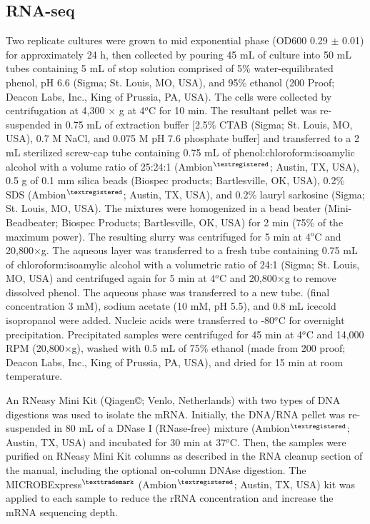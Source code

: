 \subsection{RNA-seq}
Two replicate cultures were grown to mid exponential phase (OD600 0.29 $\pm$ 0.01) for approximately 24 h, then collected by pouring 45 mL of culture into 50 mL tubes containing 5 mL of stop solution comprised of 5\% water-equilibrated phenol, pH 6.6 (Sigma; St. Louis, MO, USA), and 95\% ethanol (200 Proof; Deacon Labs, Inc., King of Prussia, PA, USA).
The cells were collected by centrifugation at 4,300 $\times$ g at 4$^o$C for 10 min.
The resultant pellet was re-suspended in 0.75 mL of extraction buffer [2.5\% CTAB (Sigma; St. Louis, MO, USA), 0.7 M NaCl, and 0.075 M pH 7.6 phosphate buffer] and transferred to a 2 mL sterilized screw-cap tube containing 0.75 mL of phenol:chloroform:isoamylic alcohol with a volume ratio of 25:24:1 (Ambion$^{\textregistered}$; Austin, TX, USA), 0.5 g of 0.1 mm silica beads (Biospec products; Bartlesville, OK, USA), 0.2\% SDS (Ambion$^{\textregistered}$; Austin, TX, USA), and 0.2\% lauryl sarkosine (Sigma; St. Louis, MO, USA).
The mixtures were homogenized in a bead beater (Mini-Beadbeater; Biospec Products; Bartlesville, OK, USA) for 2 min (75\% of the maximum power).
The resulting slurry was centrifuged for 5 min at 4$^o$C and 20,800$\times$g.
The aqueous layer was transferred to a fresh tube containing 0.75 mL of chloroform:isoamylic alcohol with a volumetric ratio of 24:1 (Sigma; St. Louis, MO, USA) and centrifuged again for 5 min at 4$^o$C and 20,800$\times$g to remove dissolved phenol.
The aqueous phase was transferred to a new tube.  (final concentration 3 mM), sodium acetate (10 mM, pH 5.5), and 0.8 mL icecold isopropanol were added.
Nucleic acids were transferred to -80$^o$C for overnight precipitation.
Precipitated samples were centrifuged for 45 min at 4$^o$C and 14,000 RPM (20,800$\times$g), washed with 0.5 mL of 75\% ethanol (made from 200 proof; Deacon Labs, Inc., King of Prussia, PA, USA), and dried for 15 min at room temperature.

An RNeasy Mini Kit (Qiagen©; Venlo, Netherlands) with two types of DNA digestions was used to isolate the mRNA. Initially, the DNA/RNA pellet was re-suspended in 80 mL of a DNase I (RNase-free) mixture (Ambion$^{\textregistered}$; Austin, TX, USA) and incubated for 30 min at 37$^o$C.
Then, the samples were purified on RNeasy Mini Kit columns as described in the RNA cleanup section of the manual, including the optional on-column DNAse digestion.
The MICROBExpress$^{\texttrademark}$ (Ambion$^{\textregistered}$; Austin, TX, USA) kit was applied to each sample to reduce the rRNA concentration and increase the mRNA sequencing depth.

